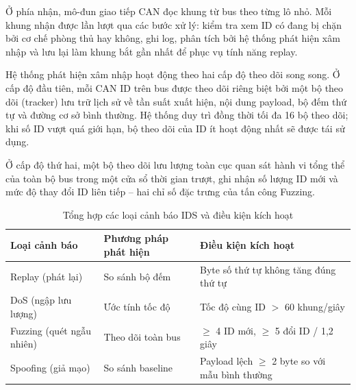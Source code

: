 Ở phía nhận, mô-đun giao tiếp CAN đọc khung từ bus theo từng lô nhỏ. Mỗi khung
nhận được lần lượt qua các bước xử lý: kiểm tra xem ID có đang bị chặn bởi
cơ chế phòng thủ hay không, ghi log, phân tích bởi hệ thống phát hiện xâm nhập và
lưu lại làm khung bắt gần nhất để phục vụ tính năng replay.


Hệ thống phát hiện xâm nhập hoạt động theo hai cấp độ theo dõi song song. Ở cấp
độ đầu tiên, mỗi CAN ID trên bus được theo dõi riêng biệt bởi một bộ theo dõi
(tracker) lưu trữ lịch sử về tần suất xuất hiện, nội dung payload, bộ đếm thứ tự
và đường cơ sở bình thường. Hệ thống duy trì đồng thời tối đa 16 bộ theo dõi; khi
số ID vượt quá giới hạn, bộ theo dõi của ID ít hoạt động nhất sẽ được tái sử dụng.

Ở cấp độ thứ hai, một bộ theo dõi lưu lượng toàn cục quan sát hành vi tổng thể của
toàn bộ bus trong một cửa sổ thời gian trượt, ghi nhận số lượng ID mới và mức độ
thay đổi ID liên tiếp -- hai chỉ số đặc trưng của tấn công Fuzzing.

\begin{table}[H]
	\centering
	\begin{tabular}{|>{\raggedright\arraybackslash}p{3.6cm}|>{\raggedright\arraybackslash}p{3.8cm}|>{\raggedright\arraybackslash}p{6cm}|}
		\hline
		\rowcolor{red!25}
		\textbf{Loại cảnh báo} & \textbf{Phương pháp phát hiện} & \textbf{Điều kiện kích hoạt} \\
		\hline
		Replay (phát lại) & So sánh bộ đếm & Byte số thứ tự không tăng đúng thứ tự \\
		\hline
		DoS (ngập lưu lượng) & Ước tính tốc độ & Tốc độ cùng ID $>$ 60 khung/giây \\
		\hline
		Fuzzing (quét ngẫu nhiên) & Theo dõi toàn bus & $\geq$ 4 ID mới, $\geq$ 5 đổi ID / 1,2 giây \\
		\hline
		Spoofing (giả mạo) & So sánh baseline & Payload lệch $\geq$ 2 byte so với mẫu bình thường \\
		\hline
	\end{tabular}
	\caption{Tổng hợp các loại cảnh báo IDS và điều kiện kích hoạt}
\end{table}

